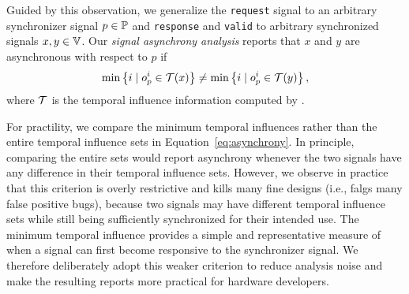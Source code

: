 Guided by this observation, we generalize the \texttt{request} signal to an arbitrary synchronizer signal $p \in \mathbb{P}$ and \texttt{response} and \texttt{valid} to arbitrary synchronized signals $x,y \in \mathbb{V}$.
Our \emph{signal asynchrony analysis} reports that $x$ and $y$ are asynchronous with respect to $p$ if
\begin{equation}\label{eq:asynchrony}
    \min\left\{i \mid o_p^i \in \mathcal{T}(x)\right\}
    \ne
    \min\left\{i \mid o_p^i \in \mathcal{T}(y)\right\},
\end{equation}
where $\mathcal{T}$ is the temporal influence information computed by \tia.

For practility, we compare the minimum temporal influences rather than the entire temporal influence sets in Equation~\ref{eq:asynchrony}.
In principle, comparing the entire sets would report asynchrony whenever the two signals have any difference in their temporal influence sets.
However, we observe in practice that this criterion is overly restrictive and kills many fine designs (i.e., falgs many false positive bugs), because two signals may have different temporal influence sets while still being sufficiently synchronized for their intended use.
The minimum temporal influence provides a simple and representative measure of when a signal can first become responsive to the synchronizer signal.
We therefore deliberately adopt this weaker criterion to reduce analysis noise and make the resulting reports more practical for hardware developers.

